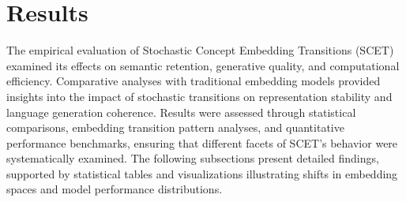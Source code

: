 \documentclass{article}
\begin{document}
\begin{table}[h]
	\caption{Experimental Setup for SCET Evaluation}
	\label{tab:experiment_setup}
	\centering
	\renewcommand{\arraystretch}{1.3}
\end{table}



\section{Results}

The empirical evaluation of Stochastic Concept Embedding Transitions (SCET) examined its effects on semantic retention, generative quality, and computational efficiency. Comparative analyses with traditional embedding models provided insights into the impact of stochastic transitions on representation stability and language generation coherence. Results were assessed through statistical comparisons, embedding transition pattern analyses, and quantitative performance benchmarks, ensuring that different facets of SCET's behavior were systematically examined. The following subsections present detailed findings, supported by statistical tables and visualizations illustrating shifts in embedding spaces and model performance distributions.
\end{document}
